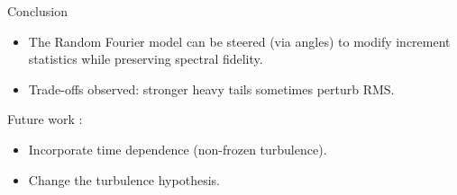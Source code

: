 \documentclass[11pt]{beamer}
\begin{document}
\begin{frame}{Conclusion}
  \begin{itemize}
    \item The Random Fourier model can be steered (via angles) to modify increment statistics while preserving spectral fidelity.
    \item Trade-offs observed: stronger heavy tails sometimes perturb RMS.
  \end{itemize}

  Future work : 
  \begin{itemize}
    \item Incorporate time dependence (non-frozen turbulence).
    \item Change the turbulence hypothesis.
  \end{itemize}
\end{frame}





\end{document}
